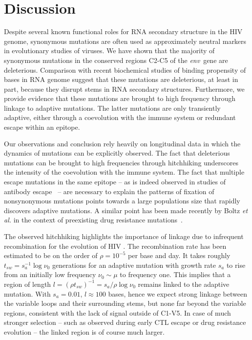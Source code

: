 \documentclass[rmp, twocolumn]{revtex4}
\newcommand{\env}{\textit{env}}
\begin{document}
\section{Discussion}
Despite several known functional roles for RNA secondary structure in the HIV
genome, synonymous mutations are often used as approximately neutral markers in
evolutionary studies of viruses. We have shown that the majority of synonymous
mutations in the conserved regions C2-C5 of the \env~gene are deleterious.
Comparison with recent biochemical studies of binding propensity of bases in RNA
genome suggest that these mutations are deleterious, at least in part, because they disrupt
stems in RNA secondary structures. Furthermore, we provide evidence that these
mutations are brought to high frequency through linkage to adaptive mutations.
The latter mutations are only transiently adaptive, either through a
coevolution with the immune system or redundant escape within an epitope. 

Our observations and conclusion rely heavily on longitudinal data in which the
dynamics of mutations can be explicitly observed. The fact that deleterious
mutations can be brought to high frequencies through hitchhiking underscores
the intensity of the coevolution with the immune system. The fact that
multiple escape mutations in the same epitope -- as is indeed observed in
studies of antibody escape~\citep{moore_limited_2009, bar_early_2012} -- are
necessary to explain the patterns of fixation of nonsynonymous mutations points
towards a large populations size that rapidly discovers adaptive mutations. A
similar point has been made recently by Boltz {\it et al.} in the context of
preexisting drug resistance mutations~\citep{boltz_ultrasensitive_2012}. 

The observed hitchhiking highlights the importance of linkage due to infrequent
recombination for the evolution of HIV
\citep{neher_recombination_2010,batorsky_estimate_2011,
josefsson_majority_2011}. The recombination rate has been estimated to be on the
order of $\rho = 10^{-5}$ per base and day. It takes roughly $t_{sw} = s_a^{-1}
\log \nu_0$ generations for an adaptive mutation with growth rate $s_a$ to rise
from an initially low frequency $\nu_0\sim \mu$ to frequency one. This implies
that a region of length $l = (\rho t_{sw})^{-1} = s_a / \rho \log \nu_0$ remains
linked to the adaptive mutation. With $s_a=0.01$, $l\approx 100$ bases, hence we 
expect strong linkage between the variable loops and their surrounding stems,
but none far beyond the variable regions, consistent with the lack of signal
outside of C1-V5. In case of much stronger selection -- such as observed during
early CTL escape or drug resistance evolution -- the linked  region is of course
much larger.
\end{document}

